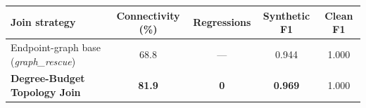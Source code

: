 {\small
\setlength{\tabcolsep}{6pt}
\begin{tabular}{p{4.6cm}cccc}
\toprule
Join strategy & Connectivity (\%) & Regressions & Synthetic F1 & Clean F1 \\
\midrule
Endpoint-graph base (\textit{graph\_rescue}) & 68.8 & --- & 0.944 & 1.000 \\
\textbf{Degree-Budget Topology Join} & \textbf{81.9} & \textbf{0} & \textbf{0.969} & 1.000 \\
\bottomrule
\end{tabular}
}

